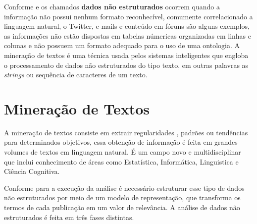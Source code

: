 \documentclass[
	12pt,				%
	openright,			%
	twoside,			%
	a4paper,			%
	english,			%
	french,				%
	spanish,			%
	brazil				%
	]{abntex2}
\begin{document}
Conforme  e  os chamados \textbf{dados não estruturados} ocorrem quando a informação não possui nenhum formato reconhecível, comumente correlacionado a linguagem natural, o Twitter, e-mails e conteúdo em fóruns são alguns exemplos, as informações não estão dispostas em tabelas númericas organizadas em linhas e colunas e não possuem um formato adequado para o uso de uma ontologia. A mineração de textos é uma técnica usada pelos sistemas inteligentes que engloba o processamento de dados não estruturados do tipo texto, em outras palavras as \emph{strings} ou sequência de caracteres de um texto.

\section{Mineração de Textos}
A mineração de textos consiste em extrair regularidades , padrões ou tendências para determinados objetivos, essa obtenção de informação é feita em grandes volumes de textos em linguagem natural. É um campo novo e multidisciplinar que inclui conhecimento de áreas como Estatística, Informática, Linguistica e Ciência Cognitiva. 

Conforme  para a execução da análise é necessário estruturar esse tipo de dados não estruturados por meio de um modelo de representação, que transforma os termos de cada publicação em um valor de relevância. A análise de dados não estruturados é feita em três fases distintas.
\end{document}
